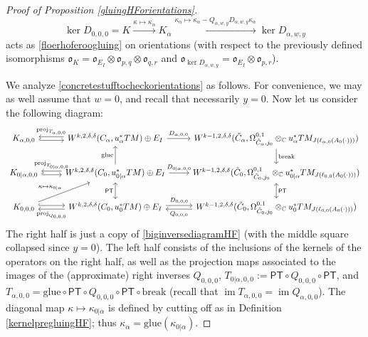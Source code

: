 \documentclass[12pt]{article}
\theoremstyle{definition}
\theoremstyle{remark}
\numberwithin{equation}{subsection}
\newcommand{\oo}{\mathfrak o}
\newcommand{\CC}{\mathbb C}
\newcommand{\PT}{\mathsf{PT}}
\newcommand{\proj}{\operatorname{proj}}
\newcommand{\im}{\operatorname{im}}
\begin{document}
\begin{proof}[Proof of Proposition \ref{gluingHForientations}]
\begin{equation}\label{concretestufftocheckorientations}
\ker D_{0,0,0}=K\xrightarrow{\kappa\mapsto\kappa_\alpha}K_\alpha\xrightarrow{\kappa_\alpha\mapsto\kappa_\alpha-Q_{\alpha,w,y}D_{\alpha,w,y}\kappa_\alpha}\ker D_{\alpha,w,y}
\end{equation}
acts as \eqref{floerhoferoogluing} on orientations (with respect to the previously defined isomorphisms $\oo_K=\oo_{E_I}\otimes\oo_{p,q}\otimes\oo_{q,r}$ and $\oo_{\ker D_{\alpha,w,y}}=\oo_{E_I}\otimes\oo_{p,r}$).

We analyze \eqref{concretestufftocheckorientations} as follows.  For convenience, we may as well assume that $w=0$, and recall that necessarily $y=0$.  Now let us consider the following diagram:
\begin{equation}
\begin{tikzcd}\label{orientationsinversediagram}
K_{\alpha,0,0}\ar[hook,yshift=-0.5ex]{r}\ar[leftarrow,yshift=0.5ex]{r}{\proj_{T_{\alpha,0,0}}}&W^{k,2,\delta,\delta}(C_\alpha,u_\alpha^\ast TM)\oplus E_I\ar{r}{D_{\alpha,0,0}}&W^{k-1,2,\delta,\delta}(\tilde C_\alpha,\Omega^{0,1}_{\tilde C_\alpha,j_0}\otimes_\CC u_\alpha^\ast TM_{J(\ell_{\alpha,0}(A_0(\cdot)))})\ar{d}{\mathrm{break}}\\
K_{0|\alpha,0,0}\ar[hook,yshift=-0.5ex]{r}\ar[leftarrow,yshift=0.5ex]{r}{\proj_{T_{0|\alpha,0,0}}}&W^{k,2,\delta,\delta}(C_0,u_{0|\alpha}^\ast TM)\oplus E_I\ar{u}{\mathrm{glue}}\ar{r}{D_{0|\alpha,0,0}}&W^{k-1,2,\delta,\delta}(\tilde C_0,\Omega^{0,1}_{\tilde C_0,j_0}\otimes_\CC u_{0|\alpha}^\ast TM_{J(\ell_{0,0}(A_0(\cdot)))})\ar[leftrightarrow]{d}{\PT}\\
K_{0,0,0}\ar[hook,yshift=0.5ex]{r}\ar[leftarrow,yshift=-0.5ex]{r}[swap]{\proj_{Q_{0,0,0}}}\ar{ru}{\kappa\mapsto\kappa_{0|\alpha}}&W^{k,2,\delta,\delta}(C_0,u_0^\ast TM)\oplus E_I\ar[leftrightarrow]{u}{\PT}\ar[yshift=0.5ex]{r}{D_{0,0,0}}&\ar[yshift=-0.5ex]{l}{Q_{0,0,0}}W^{k-1,2,\delta,\delta}(\tilde C_0,\Omega^{0,1}_{\tilde C_0,j_0}\otimes_\CC u_0^\ast TM_{J(\ell_{0,0}(A_0(\cdot)))})
\end{tikzcd}
\end{equation}
The right half is just a copy of \eqref{biginversediagramHF} (with the middle square collapsed since $y=0$).  The left half consists of the inclusions of the kernels of the operators on the right half, as well as the projection maps associated to the images of the (approximate) right inverses $Q_{0,0,0}$, $T_{0|\alpha,0,0}:=\PT\circ Q_{0,0,0}\circ\PT$, and $T_{\alpha,0,0}=\mathrm{glue}\circ\PT\circ Q_{0,0,0}\circ\PT\circ\mathrm{break}$ (recall that $\im T_{\alpha,0,0}=\im Q_{\alpha,0,0}$).  The diagonal map $\kappa\mapsto\kappa_{0|\alpha}$ is defined by cutting off as in Definition \ref{kernelpregluingHF}; thus $\kappa_\alpha=\mathrm{glue}(\kappa_{0|\alpha})$.


\end{proof}
\end{document}

